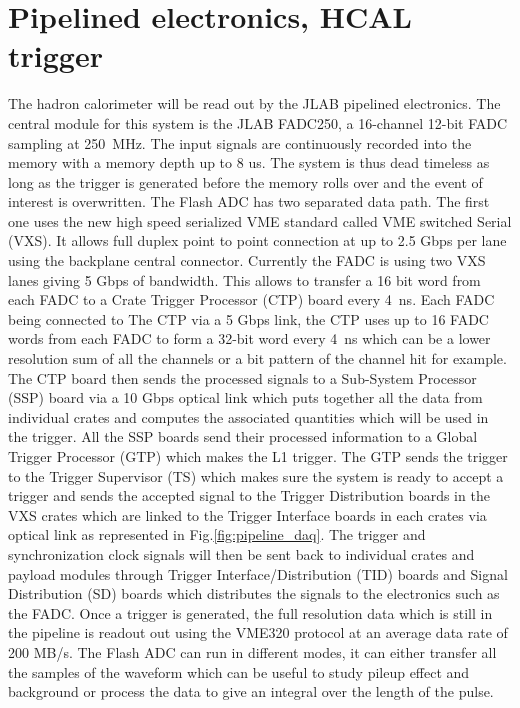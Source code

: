 \documentclass{article}
\begin{document}
\section{Pipelined electronics, HCAL trigger}
The hadron calorimeter will be read out by the JLAB pipelined electronics.
The central module for this system is the JLAB FADC250, a 16-channel 12-bit FADC sampling at 250~MHz. The input signals are continuously recorded into the memory with a memory depth up to 8 us. The system is thus dead timeless as long as the trigger is generated before the memory rolls over and the event of interest is overwritten.
The Flash ADC has two separated data path.
The first one uses the new high speed serialized VME standard called VME switched Serial (VXS).
It allows full duplex point to point connection at up to 2.5 Gbps per lane using the backplane central connector.
Currently the FADC is using two VXS lanes giving 5 Gbps of bandwidth.
This allows to transfer a 16 bit word from each FADC to a Crate Trigger Processor (CTP) board every 4~ns.
Each FADC being connected to The CTP via a 5 Gbps link, the CTP uses up to 16 FADC words from each FADC to form a 32-bit word every 4~ns which can be a lower resolution sum of all the channels or a bit pattern of the channel hit for example.
The CTP board then sends the processed signals to a Sub-System Processor (SSP) board via a 10 Gbps optical link which puts together all the data from individual crates and computes the associated quantities which will be used in the trigger.
All the SSP boards send their processed information to a Global Trigger Processor (GTP) which makes the L1 trigger.
The GTP sends the trigger to the Trigger Supervisor (TS) which makes sure the system is ready to accept a trigger and sends the accepted signal to the Trigger Distribution boards in the VXS crates which are linked to the Trigger Interface boards in each crates via optical link as represented in Fig.\ref{fig:pipeline_daq}.
The trigger and synchronization clock signals will then be sent back to individual crates and payload modules through Trigger Interface/Distribution (TID) boards and Signal Distribution (SD) boards which distributes the signals to the electronics such as the FADC.
Once a trigger is generated, the full resolution data which is still in the pipeline is readout out using the VME320 protocol at an average data rate of 200 MB/s.
The Flash ADC can run in different modes, it can either transfer all the samples of the waveform which can be useful to study pileup effect and background or process the data to give an integral over the length of the pulse.
\end{document}
